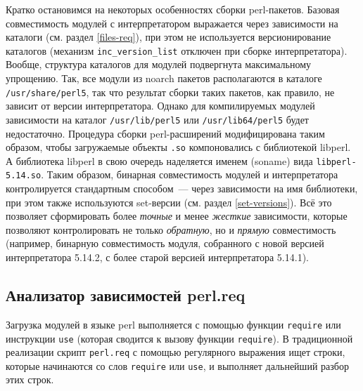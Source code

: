 \documentclass[russian,a4paper,12pt,titlepage]{article}
\begin{document}
Кратко остановимся на некоторых особенностях сборки perl-пакетов.  Базовая совместимость модулей
с интерпретатором выражается через зависимости на каталоги (см. раздел \ref{files-req}), при этом
не используется версионирование каталогов (механизм \verb|inc_version_list|
отключен при сборке интерпретатора).  Вообще, структура каталогов для модулей подвергнута максимальному упрощению.
Так, все модули из noarch пакетов располагаются в каталоге \verb|/usr/share/perl5|, так что результат
сборки таких пакетов, как правило, не зависит от версии интерпретатора.  Однако для компилируемых
модулей зависимости на каталог \verb|/usr/lib/perl5| или \verb|/usr/lib64/perl5| будет недостаточно.
Процедура сборки perl-расширений модифицирована таким образом, чтобы загружаемые объекты \verb|.so| компоновались
с библиотекой libperl.  А библиотека libperl в свою очередь наделяется именем (soname) вида \verb|libperl-5.14.so|.
Таким образом, бинарная совместимость модулей и интерпретатора контролируется стандартным способом~--- через
зависимости на имя библиотеки, при этом также используются set-версии (см. раздел \ref{set-versions}).
Всё это позволяет сформировать более \textit{точные} и менее \textit{жесткие} зависимости, которые позволяют
контролировать не только \textit{обратную}, но и \textit{прямую} совместимость (например,
бинарную совместимость модуля, собранного с новой версией интерпретатора 5.14.2, с более старой версией интерпретатора 5.14.1).

\subsection{Анализатор зависимостей perl.req}
\label{perl-req}
Загрузка модулей в языке perl выполняется с помощью функции \verb|require| или
инструкции \verb|use| (которая сводится к вызову функции \verb|require|).
В традиционной реализации скрипт \verb|perl.req| с помощью регулярного
выражения ищет строки, которые начинаются со слов \verb|require| или \verb|use|,
и выполняет дальнейший разбор этих строк.
\end{document}
